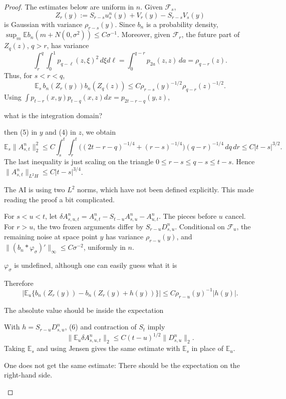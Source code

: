 \documentclass[12pt]{article}
\newcommand{\E}{\mathbb E}
\newcommand{\1}{\mathbf 1}
\newcommand{\calF}{\mathcal F}
\newcommand{\review}[1]{\begin{reviewbox}#1\end{reviewbox}}
\begin{document}
\begin{proof}
The estimates below are uniform in \(n\).  Given \(\calF_s\),
\[
Z_r(y):=S_{r-s}u_s^n(y)+V_r(y)-S_{r-s}V_s(y)
\]
is Gaussian with variance \(\rho_{r-s}(y)\).  Since \(b_n\) is a probability
density, \(\sup_m\E b_n(m+N(0,\sigma^2))\le C\sigma^{-1}\).  Moreover, given
\(\calF_r\), the future part of \(Z_q(z)\), \(q>r\), has variance
\[
 \int_r^q\!\!\int_0^1p_{q-\ell}(z,\xi)^2\,d\xi d\ell
 =\int_0^{q-r}p_{2a}(z,z)\,da=\rho_{q-r}(z).
\]
Thus, for \(s<r<q\),
\[
 \E_s\,b_n(Z_r(y))b_n(Z_q(z))
 \le C\rho_{r-s}(y)^{-1/2}\rho_{q-r}(z)^{-1/2}.              \tag{9}
\]
Using
\(\int p_{t-r}(x,y)p_{t-q}(x,z)dx=p_{2t-r-q}(y,z)\), \review{what is the integration domain?} then (5) in \(y\) and
(4) in \(z\), we obtain
\[
 \E_s\|A^n_{s,t}\|_2^2
 \le C\!\int_s^t\!\!\int_r^t
      \bigl((2t-r-q)^{-1/4}+(r-s)^{-1/4}\bigr)(q-r)^{-1/4}\,dq\,dr
 \le C|t-s|^{3/2}.                                          \tag{10}
\]
The last inequality is just scaling on the triangle
\(0\le r-s\le q-s\le t-s\).  Hence
\(\|A^n_{s,t}\|_{L^2H}\le C|t-s|^{3/4}\).
\review{The AI is using two $L^2$ norms, which have not been defined explicitly. This made reading the proof a bit complicated. }

For \(s<u<t\), let
\(\delta A^n_{s,u,t}=A^n_{s,t}-S_{t-u}A^n_{s,u}-A^n_{u,t}\).  The pieces before
\(u\) cancel.  For \(r>u\), the two frozen arguments differ by
\(S_{r-u}D^n_{s,u}\).  Conditional on \(\calF_u\), the remaining noise at
space point \(y\) has variance \(\rho_{r-u}(y)\), and
\(\|(b_n*\varphi_\sigma)'\|_\infty\le C\sigma^{-2}\), uniformly in \(n\). \review{$\varphi_\sigma$ is undefined, although one can easily guess what it is}
Therefore
\[
 \left|\E_u\{b_n(Z_r(y))-b_n(Z_r(y)+h(y))\}\right|
      \le C\rho_{r-u}(y)^{-1}|h(y)|.
\]
\review{The absolute value should be inside the expectation}
With \(h=S_{r-u}D^n_{s,u}\), (6) and contraction of \(S_t\) imply
\[
        \|\E_u\delta A^n_{s,u,t}\|_2
        \le C(t-u)^{1/2}\|D^n_{s,u}\|_2 .                    \tag{11}
\]
Taking \(\E_s\) and using Jensen gives the same estimate with \(\E_s\) in
place of \(\E_u\). 
\review{One does not get the same estimate: There should be the expectation on the right-hand side.}


\end{proof}
\end{document}
